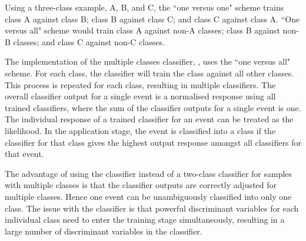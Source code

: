 Using a three-class example, A, B, and C, the ``one versus one" scheme trains class A against class B;  class B against class C; and class C against class A.  ``One versus all" scheme would train class A against non-A classes; class B against non-B classes; and class C against non-C classes.


The \TMVA implementation of the multiple classes classifier, \multiclass, uses the ``one versus all" scheme. For each class, the \multiclass classifier will train the class against all other classes. This process is repeated for each class, resulting in multiple classifiers. The overall classifier output for a single event is a normalised response using all trained classifiers, where the sum of the classifier outputs for a single event is one. The individual response of a trained classifier for an event can be treated as the likelihood. In the application stage, the event is classified into a class if the classifier for that class gives the highest output response amongst all classifiers for that event.

The advantage of using the \multiclass classifier instead of a two-class classifier for samples with multiple classes  is that the classifier outputs are correctly adjusted for multiple classes. Hence one event can  be unambiguously classified into only one class. The issue with the \multiclass classifier is that powerful discriminant variables for each individual class need to enter the training stage simultaneously, resulting in a large number of discriminant variables in the  \multiclass classifier.


